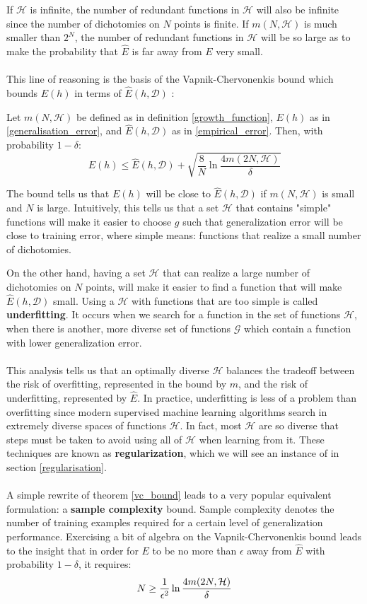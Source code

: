 If $\mathcal{H}$ is infinite, the number of redundant functions in $\mathcal{H}$ will also be infinite since the number of dichotomies on $N$ points is finite. If $m(N, \mathcal{H})$ is much smaller than $2^N$, the number of redundant functions in $\mathcal{H}$ will be so large as to make the probability that $\hat{E}$ is far away from $E$ very small.
\\\\
 This line of reasoning is the basis of the Vapnik-Chervonenkis bound which bounds $E(h)$ in terms of $\hat{E}(h, \mathcal{D})$ \citep{vapnik1971}:

\begin{theorem}
	\label{vc_bound}
	Let $m(N, \mathcal{H})$ be defined as in definition \ref{growth_function}, $E(h)$ as in \ref{generalisation_error}, and $\hat{E}(h, \mathcal{D})$ as in \ref{empirical_error}. Then, with probability $1 - \delta$:
	$$
	E(h) \leq \hat{E}(h, \mathcal{D}) + \sqrt{\frac{8}{N}\ln \frac{4m(2N, \mathcal{H})}{\delta}}
	$$
\end{theorem}
\noindent
The bound tells us that $E(h)$ will be close to $\hat{E}(h, \mathcal{D})$ if $m(N, \mathcal{H})$ is small and $N$ is large. Intuitively, this tells us that a set $\mathcal{H}$ that contains "simple" functions will make it easier to choose $g$ such that generalization error will be close to training error, where simple means: functions that realize a small number of dichotomies.

On the other hand, having a set $\mathcal{H}$ that can realize a large number of dichotomies on $N$ points, will make it easier to find a function that will make $\hat{E}(h, \mathcal{D})$ small. Using a $\mathcal{H}$ with functions that are too simple is called \textbf{underfitting}. It occurs when we search for a function in the set of functions $\mathcal{H}$, when there is another, more diverse set of functions $\mathcal{G}$ which contain a function with lower generalization error.
\\\\
This analysis tells us that an optimally diverse $\mathcal{H}$ balances the tradeoff between the risk of overfitting, represented in the bound by $m$, and the risk of underfitting, represented by $\hat{E}$. In practice, underfitting is less of a problem than overfitting since modern supervised machine learning algorithms search in extremely diverse spaces of functions $\mathcal{H}$. In fact, most $\mathcal{H}$ are so diverse that steps must be taken to avoid using all of $\mathcal{H}$ when learning from it. These techniques are known as \textbf{regularization}, which we will see an instance of in section \ref{regularisation}.
\\\\
A simple rewrite of theorem \ref{vc_bound} leads to a very popular equivalent formulation: a \textbf{sample complexity} bound. Sample complexity denotes the number of training examples required for a certain level of generalization performance. Exercising a bit of algebra on the Vapnik-Chervonenkis bound leads to the insight that in order for $E$ to be no more than $\epsilon$ away from $\hat{E}$ with probability $1 - \delta$, it requires:
$$
N \geq \frac{1}{\epsilon^2}\ln \frac{4m(2N, \mathcal{H})}{\delta}
$$
